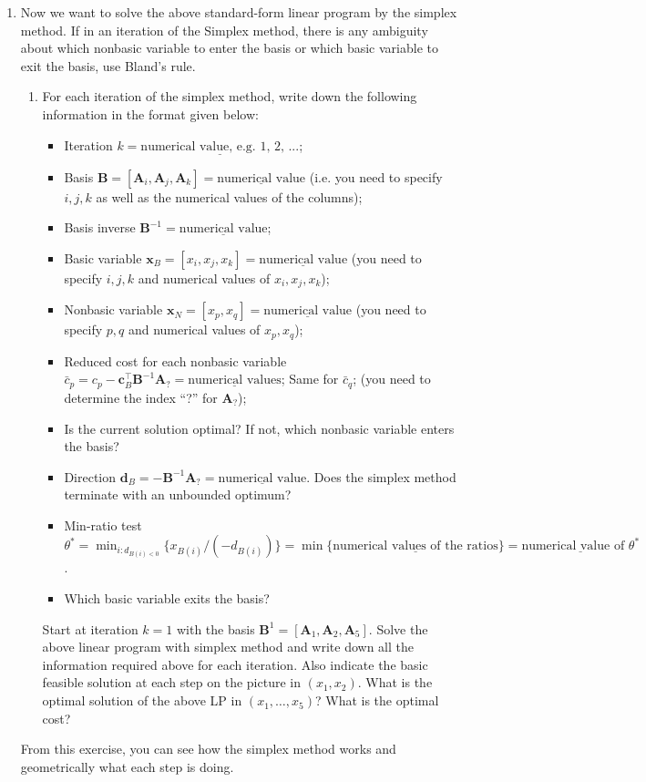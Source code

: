 \documentclass[11pt]{article}
\newcommand{\mb}[1]{\ensuremath{\boldsymbol{#1}}}
\begin{document}
\begin{enumerate}
\item Now we want to solve the above standard-form linear program by the simplex method. If in an iteration of the Simplex method, there is any ambiguity about which nonbasic variable to enter the basis or which basic variable to exit the basis, use Bland's rule. 
\begin{enumerate}
	
	\item For each iteration of the simplex method, write down the following information in the format given below:
	\begin{itemize}
		\item Iteration $k=\underline{\text{numerical value, e.g. 1, 2, ...}}$;
		\item Basis $\mb{B} = [\mb{A}_i,\mb{A}_j,\mb{A}_k]=\underline{\text{numerical value}}$ (i.e. you need to specify $i,j,k$ as well as the numerical values of the columns);
		\item Basis inverse $\mb{B}^{-1} = \underline{\text{numerical value}}$;
		\item Basic variable $\mb{x}_B = [x_i, x_j, x_k] = \underline{\text{numerical value}}$ (you need to specify $i,j,k$ and numerical values of $x_i,x_j,x_k$);
		\item Nonbasic variable $\mb{x}_N = [x_p, x_q] = \underline{\text{numerical value}}$ (you need to specify $p,q$ and numerical values of $x_p,x_q$);
		\item Reduced cost for each nonbasic variable $\bar{c}_p = c_p - \mb{c}_B^\top\mb{B}^{-1}\mb{A}_? = \underline{\text{numerical values}}$; Same for $\bar{c}_q$; (you need to determine the index ``?'' for $\mb{A}_?$);
		\item Is the current solution optimal? If not, which nonbasic variable enters the basis?
		\item Direction $\mb{d}_B = -\mb{B}^{-1}\mb{A}_?=\underline{\text{numerical value}}$. Does the simplex method terminate with an unbounded optimum?
		\item Min-ratio test $\theta^* = \min_{i : {d}_{B(i)<0}}\{x_{B(i)}/(-d_{B(i)})\}=\min\{\underline{\text{numerical values of the ratios}}\}=\underline{\text{numerical value of $\theta^*$}}$. 
		\item Which basic variable exits the basis?
	\end{itemize}
	Start at iteration $k=1$ with the basis $\mb{B}^1=[\mb{A}_1,\mb{A}_2,\mb{A}_5]$. Solve the above linear program with simplex method and write down all the information required above for each iteration. Also indicate the basic feasible solution at each step on the picture in $(x_1, x_2)$. What is the optimal solution of the above LP in $(x_1, \dots, x_5)$? What is the optimal cost?
\end{enumerate}
From this exercise, you can see how the simplex method works and geometrically what each step is doing. 
\end{enumerate}
\end{document}
